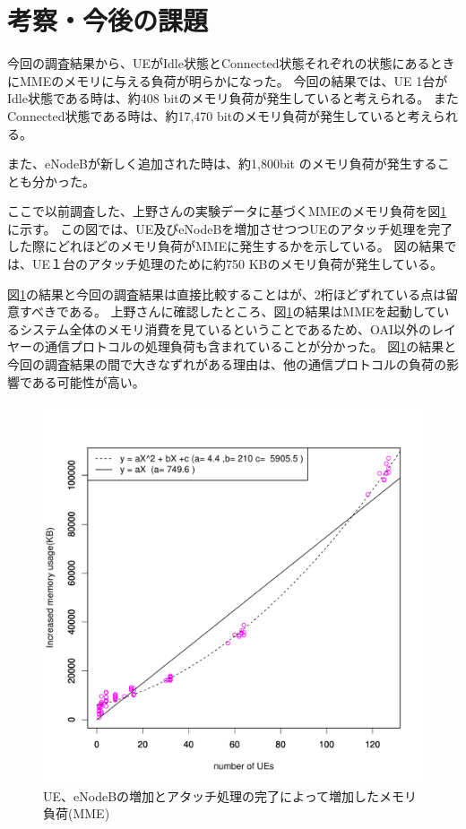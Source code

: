 \documentclass[a4j]{ujarticle}
\begin{document}
\section{考察・今後の課題}
今回の調査結果から、UEがIdle状態とConnected状態それぞれの状態にあるときにMMEのメモリに与える負荷が明らかになった。
今回の結果では、UE 1台がIdle状態である時は、約408 bitのメモリ負荷が発生していると考えられる。
またConnected状態である時は、約17,470 bitのメモリ負荷が発生していると考えられる。

また、eNodeBが新しく追加された時は、約1,800bit のメモリ負荷が発生することも分かった。

ここで以前調査した、上野さんの実験データに基づくMMEのメモリ負荷を図\ref{fig:mme_memory}に示す。
この図では、UE及びeNodeBを増加させつつUEのアタッチ処理を完了した際にどれほどのメモリ負荷がMMEに発生するかを示している。
図の結果では、UE１台のアタッチ処理のために約750 KBのメモリ負荷が発生している。

図\ref{fig:mme_memory}の結果と今回の調査結果は直接比較することはが、2桁ほどずれている点は留意すべきである。
上野さんに確認したところ、図\ref{fig:mme_memory}の結果はMMEを起動しているシステム全体のメモリ消費を見ているということであるため、OAI以外のレイヤーの通信プロトコルの処理負荷も含まれていることが分かった。
図\ref{fig:mme_memory}の結果と今回の調査結果の間で大きなずれがある理由は、他の通信プロトコルの負荷の影響である可能性が高い。
\begin{figure}[htbp]
  \centering
  \includegraphics[width=0.9\hsize]{mme_memory.pdf}
  \caption{UE、eNodeBの増加とアタッチ処理の完了によって増加したメモリ負荷(MME)}
  \label{fig:mme_memory}
\end{figure}
\end{document}

